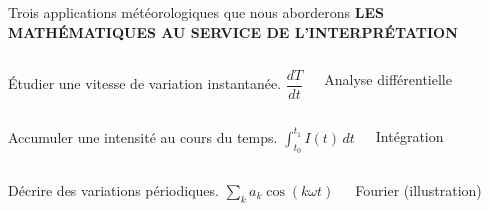\documentclass[aspectratio=169,10pt]{beamer}
\newcommand{\meta}[1]{{\small\bfseries\color{turquoise} #1}\par\vspace{0.07cm}}
\begin{document}
\begin{frame}{Trois applications météorologiques que nous aborderons}
\meta{LES MATHÉMATIQUES AU SERVICE DE L'INTERPRÉTATION}
\begin{tcolorbox}[colback=pale,colframe=pale]
\begin{columns}[c,onlytextwidth]
\par\small Étudier une vitesse de variation instantanée.
\centering $\dfrac{dT}{dt}$\par\scriptsize Analyse différentielle
\end{columns}
\end{tcolorbox}
\vspace{0.06cm}
\begin{tcolorbox}[colback=palevert,colframe=palevert]
\begin{columns}[c,onlytextwidth]
\par\small Accumuler une intensité au cours du temps.
\centering $\displaystyle\int_{t_0}^{t_1}I(t)\,dt$\par\scriptsize Intégration
\end{columns}
\end{tcolorbox}
\vspace{0.06cm}
\begin{tcolorbox}[colback=paleorange,colframe=paleorange]
\begin{columns}[c,onlytextwidth]
\par\small Décrire des variations périodiques.
\centering $\displaystyle\sum_k a_k\cos(k\omega t)$\par\scriptsize Fourier (illustration)
\end{columns}
\end{tcolorbox}
\end{frame}
\end{document}
